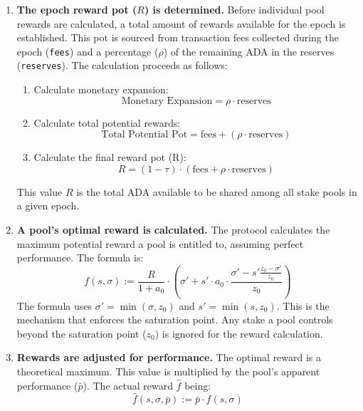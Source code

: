 \documentclass[11pt, letterpaper]{article}
\begin{document}
\begin{enumerate}
	\item \textbf{The epoch reward pot ($R$) is determined.} Before individual pool rewards are calculated, a
	      total amount of rewards available for the epoch is established. This pot is sourced from transaction fees
	      collected during the epoch (\texttt{fees}) and a percentage ($\rho$) of the remaining ADA in the reserves
	      (\texttt{reserves}). The calculation proceeds as follows:
	      \begin{enumerate}
		      \item Calculate monetary expansion: \[ \text{Monetary Expansion} = \rho \cdot \text{reserves} \]
		      \item Calculate total potential rewards:
		            \[ \text{Total Potential Pot} = \text{fees} + (\rho \cdot \text{reserves}) \]
		      \item Calculate the final reward pot (R):
		            \[ R = (1 - \tau) \cdot (\text{fees} + \rho \cdot \text{reserves}) \]
	      \end{enumerate}
	      This value $R$ is the total ADA available to be shared among all stake pools in a given epoch.

	\item \textbf{A pool's optimal reward is calculated.} The protocol calculates the maximum potential reward
	      a pool is entitled to, assuming perfect performance. The formula is:
	      \[ f(s, \sigma) := \frac{R}{1+a_0} \cdot
		      \left(\sigma' + s' \cdot a_0 \cdot \frac{\sigma' - s' \frac{z_0 - \sigma'}{z_0}}{z_0}\right) \]
	      The formula uses $\sigma' = \min(\sigma, z_0)$ and $s' = \min(s, z_0)$. This is
	      the mechanism that enforces the saturation point. Any stake a pool controls
	      beyond the saturation point ($z_{0}$) is ignored for the reward calculation.

	\item \textbf{Rewards are adjusted for performance.} The optimal reward is a theoretical maximum. This value
	      is multiplied by the pool's apparent performance ($\bar{p}$). The actual reward $\hat{f}$ being:
	      \[ \hat{f}(s, \sigma, \bar{p}) := \bar{p} \cdot f(s, \sigma) \]


\end{enumerate}
\end{document}
